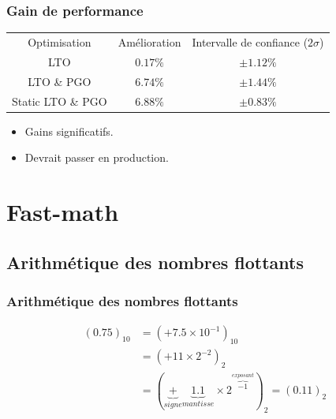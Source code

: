 \documentclass{beamer}
\begin{document}
\begin{frame}[fragile]
    \frametitle{Gain de performance}

    \begin{center}
        \begin{tabular}{ c c c }
            Optimisation      & Amélioration & Intervalle de confiance ($2\sigma$) \\
            LTO               & $0.17\%$     & $\pm 1.12\%$                        \\
            LTO \& PGO        & $6.74\%$     & $\pm 1.44\%$                        \\
            Static LTO \& PGO & $6.88\%$     & $\pm 0.83\%$
        \end{tabular}
    \end{center}

    \begin{itemize}
        \item Gains significatifs.
        \item Devrait passer en production.
    \end{itemize}
\end{frame}

\section{Fast-math}

\begin{frame}
    \tableofcontents[currentsection]
\end{frame}

\subsection{Arithmétique des nombres flottants}

\begin{frame}
    \frametitle{Arithmétique des nombres flottants}

    \begin{displaymath}
        \begin{split}
            (0.75)_{10} & = (+ 7.5 \times 10^{-1})_{10} \\
            & = (+11 \times 2^{-2})_{2} \\
            & = (\underbrace{+}_{signe} \underbrace{1.1}_{mantisse} \times 2^{\overbrace{-1}^{exposant}})_{2} = (0.11)_{2}
        \end{split}
    \end{displaymath}
\end{frame}
\end{document}
